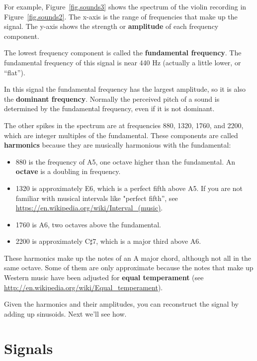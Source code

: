 \documentclass[12pt]{book}
\begin{document}
For example, Figure~\ref{fig.sounds3} shows the spectrum of the violin
recording in Figure~\ref{fig.sounds2}.  The x-axis is the range of
frequencies that make up the signal.  The y-axis shows the strength
or {\bf amplitude} of each frequency component.

The lowest frequency component is called the {\bf fundamental
  frequency}.  The fundamental frequency of this signal is near 440 Hz
(actually a little lower, or ``flat'').

In this signal the fundamental frequency has the largest amplitude,
so it is also the {\bf dominant frequency}.
Normally the perceived pitch of a sound is determined by the
fundamental frequency, even if it is not dominant.

The other spikes in the spectrum are at frequencies 880, 1320, 1760, and
2200, which are integer multiples of the fundamental.
These components are called {\bf harmonics} because they are
musically harmonious with the fundamental:

\begin{itemize}

\item 880 is the frequency of A5, one octave higher than the fundamental.
An {\bf octave} is a doubling in frequency.

\item 1320 is approximately E6, which is a perfect fifth above A5.
  If you are not familiar with musical intervals like "perfect fifth'', see
  \url{https://en.wikipedia.org/wiki/Interval_(music)}.

\item 1760 is A6, two octaves above the fundamental.

\item 2200 is approximately C$\sharp$7, which is a major third
above A6.

\end{itemize}

These harmonics make up the notes of an A major
chord, although not all in the same octave.  Some of them are only
approximate because the notes that make up Western music have been
adjusted for {\bf equal temperament} (see
 \url{http://en.wikipedia.org/wiki/Equal_temperament}).

Given the harmonics and their amplitudes, you can reconstruct the
signal by adding up sinusoids.
Next we'll see how.


\section{Signals}
\end{document}

